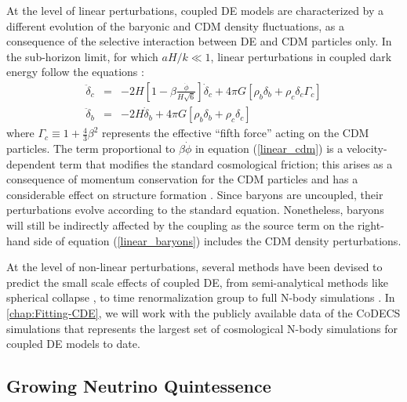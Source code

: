 At the level of linear perturbations, coupled DE models are characterized
by a different evolution of the baryonic and CDM density fluctuations,
as a consequence of the selective interaction between DE and CDM particles
only. In the sub-horizon limit, for which $aH/k\ll1$, linear perturbations
in coupled dark energy follow the equations \citep{Amendola_2004,pettorino_baccigalupi_2008}:
\begin{eqnarray}
\ddot{\delta}_{c} & = & -2H\left[1-\beta\frac{\dot{\phi}}{H\sqrt{6}}\right]\dot{\delta}_{c}+4\pi G\left[\rho_{b}\delta_{b}+\rho_{c}\delta_{c}\Gamma_{c}\right]\label{linear_cdm}\\
\ddot{\delta}_{b} & = & -2H\dot{\delta}_{b}+4\pi G\left[\rho_{b}\delta_{b}+\rho_{c}\delta_{c}\right]\label{linear_baryons}
\end{eqnarray}
where $\Gamma_{c}\equiv1+\frac{4}{3}\beta^{2}$ represents the effective
``fifth force'' acting on the CDM particles. The term proportional
to $\beta\dot{\phi}$ in equation (\ref{linear_cdm}) is a velocity-dependent
term that modifies the standard cosmological friction; this arises
as a consequence of momentum conservation for the CDM particles and
has a considerable effect on structure formation \citep{baldi_etal_2010,baldi_clarifying_2011,Li_Barrow_2011}.
Since baryons are uncoupled, their perturbations evolve according
to the standard equation. Nonetheless, baryons will still be indirectly
affected by the coupling as the source term on the right-hand side
of equation (\ref{linear_baryons}) includes the CDM density perturbations.

At the level of non-linear perturbations, several methods have been
devised to predict the small scale effects of coupled DE, from semi-analytical
methods like spherical collapse \cite{Pace_Waizmann_Bartelmann_2010},
to time renormalization group \citep{Saracco_etal_2010} to full N-body
simulations \citep{Maccio_etal_2004,baldi_etal_2010,Li_Barrow_2011,Carlesi_etal_2014a}.
In \cref{chap:Fitting-CDE}, we will work with the publicly available data of
the \textsc{CoDECS} simulations \citep{baldi_codecs_2012}
that represents the largest set of cosmological N-body simulations
for coupled DE models to date.



\subsection{Growing Neutrino Quintessence \label{sub:GNQ}}

